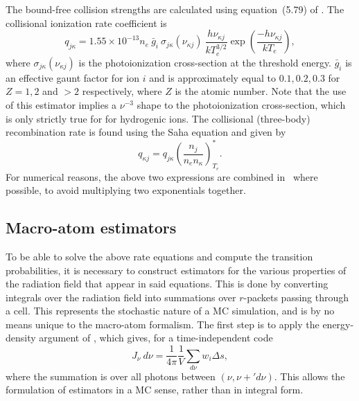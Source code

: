 The bound-free collision strengths are calculated using equation~(5.79) of
\cite{mihalas}. The collisional ionization rate coefficient is
\begin{equation}
q_{j\kappa} = 1.55 \times 10^{-13} n_e~\bar{g}_{i}~\sigma_{j\kappa} (\nu_{\kappa j})~
\frac{h \nu_{\kappa j}}{k T_e^{3/2}}
\exp \left( \frac{- h \nu_{\kappa j}}{k T_e} \right),
\label{eq:qioniz}
\end{equation}
where $\sigma_{j\kappa} (\nu_{\kappa j})$ is the photoionization cross-section 
at the threshold energy.
$\bar{g}_{i}$ is an effective gaunt factor for ion $i$ and is approximately
equal to $0.1,0.2,0.3$ for $Z=1,2$ and $>2$ respectively,
where $Z$ is the atomic number. Note that the use of this estimator
implies a $\nu^{-3}$ shape to the photoionization cross-section,
which is only strictly true for for hydrogenic ions.
The collisional (three-body) recombination rate is found using the Saha equation
and given by
\begin{equation}
q_{\kappa j} = q_{j\kappa} \left( \frac{n_j}{n_e n_\kappa} \right)^*_{T_e}.
\label{eq:qrecomb}
\end{equation}
For numerical reasons, the above two expressions are combined in \py\ where 
possible, to avoid multiplying two exponentials together.





\subsection{Macro-atom estimators}
\label{sec:estimators}
To be able to solve the above rate equations and compute the transition 
probabilities, it is necessary to construct estimators for the various properties
of the radiation field that appear in said equations. This is done
by converting integrals over the radiation field into summations over 
$r$-packets passing through a cell. This represents the stochastic nature of
a MC simulation, and is by no means unique to the macro-atom formalism.
The first step is to apply the energy-density argument of \cite{lucy1999radeq},
which gives, for a time-independent code
\begin{equation}
J_\nu~d\nu = \frac{1}{4\pi}\frac{1}{V} \sum_{d\nu} w_i \Delta s,
\end{equation}
where the summation is over all photons between $(\nu, \nu+'d\nu)$. This allows
the formulation of estimators in a MC sense, rather than in integral form. 

